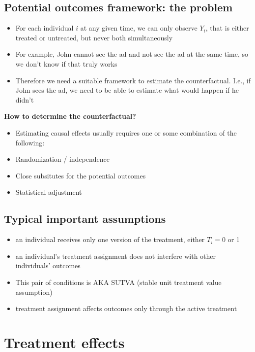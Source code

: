 \documentclass[10pt]{article}
\begin{document}
\subsection{Potential outcomes framework: the problem}
\begin{itemize}
    \item For each individual $ i $ at any given time, we can only observe $Y_i $, that is either treated or untreated, but never both simultaneously
    \item For example, John cannot see the ad and not see the ad at the same time, so we don't know if that truly works
    \item Therefore we need a suitable framework to estimate the counterfactual. I.e., if John sees the ad, we need to be able to estimate what would happen if he didn't
\end{itemize}
\textbf{How to determine the counterfactual?}
\begin{itemize}
    \item Estimating causal effects usually requires one or some combination of the following: 
    \item Randomization / independence
    \item Close subsitutes for the potential outcomes 
    \item Statistical adjustment
\end{itemize}
\subsection{Typical important assumptions}
\begin{itemize}
    \item an individual receives only one version of the treatment, either $T_i = 0 $ or 1
    \item an individual's treatment assignment does not interfere with other individuals' outcomes 
    \item This pair of conditions is AKA SUTVA (stable unit treatment value assumption)
    \item treatment assignment affects outcomes only through the active treatment 
\end{itemize}
\section{Treatment effects}
\end{document}
